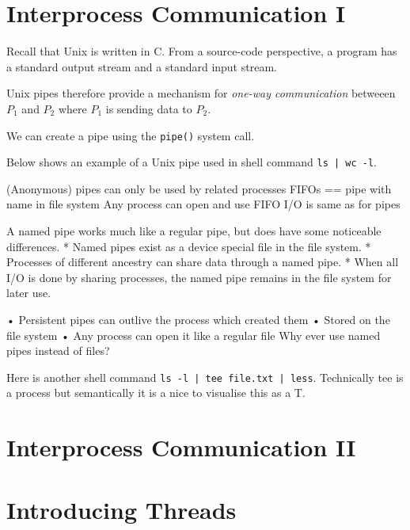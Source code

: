 \section{Interprocess Communication I}



Recall that Unix is written in C. From a source-code perspective, 
a program has a standard output stream and a standard input stream. 


Unix pipes therefore provide a mechanism
for \textit{one-way communication} betweeen $P_1$ and $P_2$ where 
$P_1$ is sending data to $P_2$. 

We can create a pipe using the \lstinline{pipe()} system call.




\begin{example}
Below shows an example of a Unix pipe used in shell command \lstinline{ls | wc -l}.

\begin{figure}[h]
\end{figure} 
\end{example}


(Anonymous) pipes can only be used by related 
processes
FIFOs == pipe with name in file system
Any process can open and use FIFO
I/O is same as for pipes

A named pipe works much like a regular pipe, but does have
some noticeable differences.
* Named pipes exist as a device special file in the file
system.
* Processes of different ancestry can share data through a
named pipe.
* When all I/O is done by sharing processes, the named 
pipe remains in the file system for later use.

• Persistent pipes can outlive the process which 
created them
• Stored on the file system
• Any process can open it like a regular file
 Why ever use named pipes instead of files?


\begin{example}
Here is another shell command \lstinline{ls -l | tee file.txt | less}.
Technically tee is a process but semantically it is a nice to
visualise this as a T. 
\end{example}



\section{Interprocess Communication II}

\section{Introducing Threads}